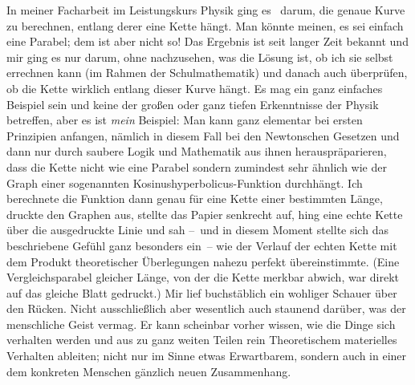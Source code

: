 In meiner Facharbeit im Leistungskurs Physik ging es \ua\ darum, die genaue
  Kurve zu berechnen, entlang derer eine Kette hängt. Man könnte meinen, es
  sei einfach eine Parabel; dem ist aber nicht so! Das Ergebnis ist seit
  langer Zeit bekannt und mir ging es nur darum, ohne nachzusehen, was die
  Lösung ist, ob ich sie selbst errechnen kann (im Rahmen der Schulmathematik)
  und danach auch überprüfen, ob die Kette wirklich entlang dieser Kurve hängt.
Es mag ein ganz einfaches Beispiel sein und keine der großen oder ganz tiefen
Erkenntnisse der Physik betreffen, aber es ist \emph{mein} Beispiel:
Man kann ganz elementar bei ersten Prinzipien anfangen, nämlich in diesem Fall
  bei den Newtonschen Gesetzen und dann nur durch saubere Logik und Mathematik
  aus ihnen herauspräparieren, dass die Kette nicht wie eine Parabel sondern
  zumindest sehr ähnlich wie der Graph einer sogenannten
  Kosinushyperbolicus-Funktion durchhängt.
Ich berechnete die Funktion dann genau für eine Kette einer bestimmten Länge,
  druckte den Graphen aus, stellte das Papier senkrecht auf, hing eine echte
  Kette über die ausgedruckte Linie und sah --~und in diesem Moment stellte
  sich das beschriebene Gefühl ganz besonders ein~-- wie der Verlauf der
  echten Kette mit dem Produkt theoretischer Überlegungen nahezu perfekt
  übereinstimmte.
  (Eine Vergleichsparabel gleicher Länge, von der die Kette merkbar abwich, war
  direkt auf das gleiche Blatt gedruckt.)
Mir lief buchstäblich ein wohliger Schauer über den Rücken. Nicht
  ausschließlich aber wesentlich auch staunend darüber, was der menschliche
  Geist vermag.
Er kann scheinbar vorher wissen, wie die Dinge sich verhalten werden und aus
  zu ganz weiten Teilen rein Theoretischem materielles Verhalten ableiten;
  nicht nur im Sinne etwas Erwartbarem, sondern auch in einer dem konkreten
  Menschen gänzlich neuen Zusammenhang.


